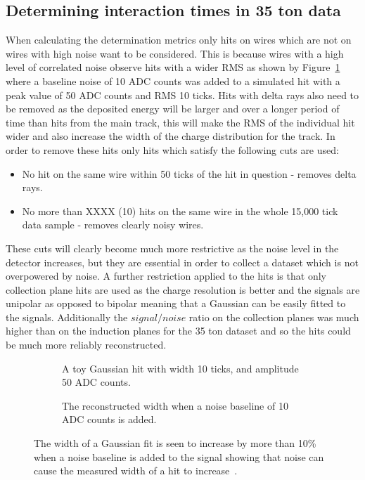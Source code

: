 \subsection{Determining interaction times in 35 ton data}
When calculating the determination metrics only hits on wires which are not on wires with high noise want to be considered. This is because wires with a high level of correlated noise observe hits with a wider RMS as shown by Figure~\ref{fig:DomsHitModel} where a baseline noise of 10 ADC counts was added to a simulated hit with a peak value of 50 ADC counts and RMS 10 ticks. Hits with delta rays also need to be removed as the deposited energy will be larger and over a longer period of time than hits from the main track, this will make the RMS of the individual hit wider and also increase the width of the charge distribution for the track. In order to remove these hits only hits which satisfy the following cuts are used:
\begin{itemize}
\item No hit on the same wire within 50 ticks of the hit in question - removes delta rays.
\item No more than XXXX (10) hits on the same wire in the whole 15,000 tick data sample - removes clearly noisy wires.
\end{itemize}
These cuts will clearly become much more restrictive as the noise level in the detector increases, but they are essential in order to collect a dataset which is not overpowered by noise. A further restriction applied to the hits is that only collection plane hits are used as the charge resolution is better and the signals are unipolar as opposed to bipolar meaning that a Gaussian can be easily fitted to the signals. Additionally the $signal/noise$ ratio on the collection planes was much higher than on the induction planes for the 35 ton dataset and so the hits could be much more reliably reconstructed. \\

\begin{figure}[h!]
  \centering
  \begin{subfigure}{0.45\textwidth}
    \centering
    \caption{A toy Gaussian hit with width 10 ticks, and amplitude 50 ADC counts.}
  \end{subfigure}
  \hspace{0.08\textwidth}
  \begin{subfigure}{0.45\textwidth}
    \centering
    \caption{The reconstructed width when a noise baseline of 10 ADC counts is added.}
  \end{subfigure}
  \caption[The effect of adding a noise baseline to a hit]
          {The width of a Gaussian fit is seen to increase by more than 10\% when a noise baseline is added to the signal showing that noise can cause the measured width of a hit to increase~\citep{DomSeptMeeting}.}
          \label{fig:DomsHitModel}
\end{figure}  

